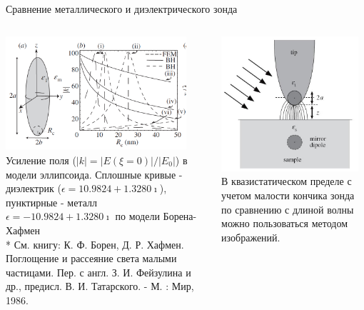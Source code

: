 \documentclass[9pt, compress, xcolor=table]{beamer}
\begin{document}
\begin{frame}{Сравнение металлического и диэлектрического зонда}
\begin{columns}[c]
\column{6.5cm}
\begin{center}
\includegraphics[width=0.9\textwidth]{nfm32}
\newline Усиление поля ($|k|=|E(\xi=0)|/|E_0|$) в модели эллипсоида. Сплошные кривые - диэлектрик ($\epsilon =10.9824+1.3280 \imath$), пунктирные - металл $\epsilon =-10.9824+1.3280 \imath$ по модели Борена-Хафмен \\*
См. книгу: К. Ф. Борен, Д. Р. Хафмен. Поглощение и рассеяние света малыми частицами. Пер. с англ. З. И. Фейзулина и др., предисл. В. И. Татарского. - М. : Мир, 1986.
\end{center}

\column{6.5cm}
\begin{center}
\includegraphics[width=0.95\textwidth]{nfm5}
\newline В квазистатическом пределе с учетом малости кончика зонда по сравнению с длиной волны можно пользоваться методом изображений.
\end{center}

\end{columns}

\end{frame}
\end{document}
